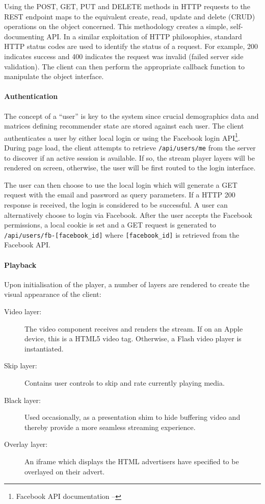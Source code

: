 Using the POST, GET, PUT and DELETE methods in HTTP requests to the REST endpoint maps to the equivalent create, read, update and delete (CRUD) operations on the object concerned. This methodology creates a simple, self-documenting API. In a similar exploitation of HTTP philosophies, standard HTTP status codes are used to identify the status of a request. For example, 200 indicates success and 400 indicates the request was invalid (failed server side validation). The client can then perform the appropriate callback function to manipulate the object interface.

\paragraph{Authentication}

The concept of a ``user'' is key to the system since crucial demographics data and matrices defining recommender state are stored against each user. The client authenticates a user by either local login or using the Facebook login API\footnote{Facebook API documentation -- }. During page load, the client attempts to retrieve \texttt{/api/users/me} from the server to discover if an active session is available. If so, the stream player layers will be rendered on screen, otherwise, the user will be first routed to the login interface.

The user can then choose to use the local login which will generate a GET request with the email and password as query parameters. If a HTTP 200 response is received, the login is considered to be successful. A user can alternatively choose to login via Facebook. After the user accepts the Facebook permissions, a local cookie is set and a GET request is generated to \texttt{/api/users/fb-[facebook\_id]} where \texttt{[facebook\_id]} is retrieved from the Facebook API.

\paragraph{Playback}

Upon initialisation of the player, a number of layers are rendered to create the visual appearance of the client:

\begin{description}
	\item[Video layer:] The video component receives and renders the stream. If on an Apple device, this is a HTML5 video tag. Otherwise, a Flash video player is instantiated.
	\item[Skip layer:] Contains user controls to skip and rate currently playing media.
	\item[Black layer:] Used occasionally, as a presentation shim to hide buffering video and thereby provide a more seamless streaming experience.
	\item[Overlay layer:] An iframe which displays the HTML advertisers have specified to be overlayed on their advert.
\end{description}

